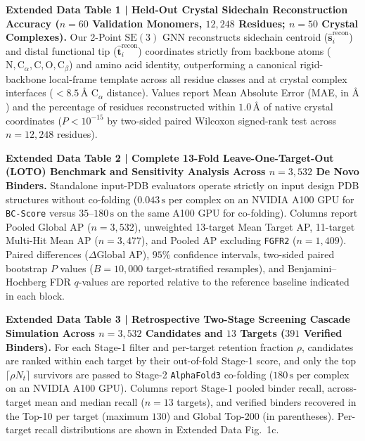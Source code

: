 \documentclass[11pt]{article}
\begin{document}
\textbf{Extended Data Table 1 | Held-Out Crystal Sidechain Reconstruction Accuracy ($n = 60$ Validation Monomers, $12,248$ Residues; $n = 50$ Crystal Complexes).}
Our 2-Point $\text{SE}(3)$ GNN reconstructs sidechain centroid ($\hat{\mathbf{s}}_i^{\text{recon}}$) and distal functional tip ($\hat{\mathbf{t}}_i^{\text{recon}}$) coordinates strictly from backbone atoms ($\text{N}, \text{C}_\alpha, \text{C}, \text{O}, \text{C}_\beta$) and amino acid identity, outperforming a canonical rigid-backbone local-frame template across all residue classes and at crystal complex interfaces ($<8.5\,\text{\AA}$ $\text{C}_\alpha$ distance). Values report Mean Absolute Error (MAE, in $\text{\AA}$) and the percentage of residues reconstructed within $1.0\,\text{\AA}$ of native crystal coordinates ($P < 10^{-15}$ by two-sided paired Wilcoxon signed-rank test across $n = 12,248$ residues).

\textbf{Extended Data Table 2 | Complete 13-Fold Leave-One-Target-Out (LOTO) Benchmark and Sensitivity Analysis Across $n = 3,532$ De Novo Binders.}
Standalone input-PDB evaluators operate strictly on input design PDB structures without co-folding ($0.043\,\text{s}$ per complex on an NVIDIA A100 GPU for \texttt{BC-Score} versus $35\text{--}180\,\text{s}$ on the same A100 GPU for co-folding). Columns report Pooled Global AP ($n = 3,532$), unweighted 13-target Mean Target AP, 11-target Multi-Hit Mean AP ($n = 3,477$), and Pooled AP excluding \texttt{FGFR2} ($n = 1,409$). Paired differences ($\Delta\text{Global AP}$), $95\%$ confidence intervals, two-sided paired bootstrap $P$ values ($B = 10,000$ target-stratified resamples), and Benjamini--Hochberg FDR $q$-values are reported relative to the reference baseline indicated in each block.

\textbf{Extended Data Table 3 | Retrospective Two-Stage Screening Cascade Simulation Across $n = 3,532$ Candidates and $13$ Targets ($391$ Verified Binders).}
For each Stage-1 filter and per-target retention fraction $\rho$, candidates are ranked within each target by their out-of-fold Stage-1 score, and only the top $\lceil \rho N_t \rceil$ survivors are passed to Stage-2 \texttt{AlphaFold3} co-folding ($180\,\text{s}$ per complex on an NVIDIA A100 GPU). Columns report Stage-1 pooled binder recall, across-target mean and median recall ($n = 13$ targets), and verified binders recovered in the Top-10 per target (maximum $130$) and Global Top-200 (in parentheses). Per-target recall distributions are shown in Extended Data Fig.~1c.
\end{document}

